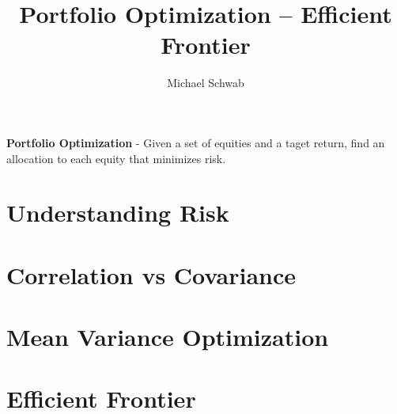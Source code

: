 \documentclass{article}
\title{Portfolio Optimization -- Efficient Frontier}
\author{Michael Schwab}
\begin{document}
\maketitle

\textbf{Portfolio Optimization} - Given a set of equities and a taget return, find an allocation to each equity that minimizes risk.
\section{Understanding Risk}

\section{Correlation vs Covariance}
\section{Mean Variance Optimization}
\section{Efficient Frontier}
\end{document}
